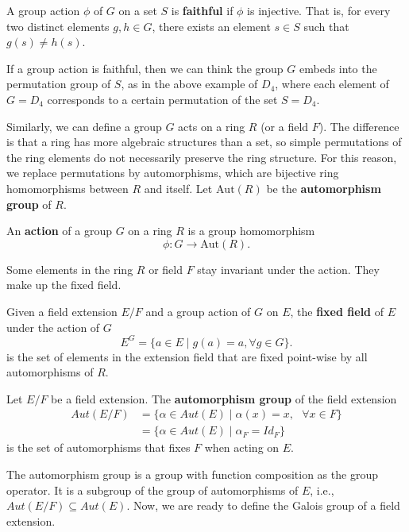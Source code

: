 \documentclass[../main.tex]{subfiles}
\begin{document}
\reversemarginpar
{}
\begin{definition}
A group action $\phi$ of $G$ on a set $S$ is \textbf{faithful} if $\phi$ is injective. That is, for every two distinct elements $g, h \in G$, there exists an element $s \in S$ such that $g(s) \neq h(s)$. 
\end{definition}
If a group action is faithful, then we can think the group $G$ embeds into the permutation group of $S$, as in the above example of $D_4$, where each element of $G=D_4$ corresponds to a certain permutation of the set $S=D_4$.

Similarly, we can define a group $G$ acts on a ring $R$ (or a field $F$). The difference is that a ring has more algebraic structures than a set, so simple permutations of the ring elements do not necessarily preserve the ring structure. For this reason, we replace permutations by automorphisms, which are bijective ring homomorphisms between $R$ and itself. Let $\text{Aut}(R)$ be the \textbf{automorphism group} of $R$. 

\begin{definition}
An \textbf{action} of a group $G$ on a ring $R$ is a group homomorphism 
\begin{equation*}
    \phi: G \rightarrow \text{Aut}(R).
\end{equation*}
\end{definition}


\reversemarginpar
{}
Some elements in the ring $R$ or field $F$ stay invariant under the action. They make up the fixed field. 

\begin{definition}
Given a field extension $E/F$ and a group action of $G$ on $E$, the \textbf{fixed field} of $E$ under the action of $G$ 
\begin{equation*}
    E^G = \{a \in E \mid g(a)=a, \forall g \in G\}.
\end{equation*}
is the set of elements in the extension field that are fixed point-wise by all automorphisms of $R$. 
\end{definition}


\reversemarginpar
{}
\begin{definition}
Let $E/F$ be a field extension. The \textbf{automorphism group} of the field extension 
\begin{align*}
    Aut(E/F) &= \{\alpha \in Aut(E) \mid \alpha(x) = x, \text{ } \forall x \in F\} \\
    &=\{\alpha \in Aut(E) \mid \alpha_F = Id_F\}
\end{align*}
is the set of automorphisms that fixes $F$ when acting on $E$.
\end{definition}
The automorphism group is a group with function composition as the group operator. It is a subgroup of the group of automorphisms of $E$, i.e., $Aut(E/F) \subseteq Aut(E)$. Now, we are ready to define the Galois group of a field extension.  
\end{document}
